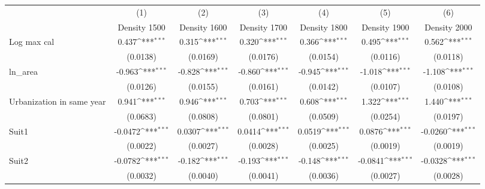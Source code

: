 {
\def\sym#1{\ifmmode^{#1}\else\(^{#1}\)\fi}
\begin{tabular}{l*{6}{c}}
\toprule
                    &\multicolumn{1}{c}{(1)}&\multicolumn{1}{c}{(2)}&\multicolumn{1}{c}{(3)}&\multicolumn{1}{c}{(4)}&\multicolumn{1}{c}{(5)}&\multicolumn{1}{c}{(6)}\\
                    &\multicolumn{1}{c}{Density 1500}&\multicolumn{1}{c}{Density 1600}&\multicolumn{1}{c}{Density 1700}&\multicolumn{1}{c}{Density 1800}&\multicolumn{1}{c}{Density 1900}&\multicolumn{1}{c}{Density 2000}\\
\midrule
Log max cal         &       0.437\sym{***}&       0.315\sym{***}&       0.320\sym{***}&       0.366\sym{***}&       0.495\sym{***}&       0.562\sym{***}\\
                    &    (0.0138)         &    (0.0169)         &    (0.0176)         &    (0.0154)         &    (0.0116)         &    (0.0118)         \\
\addlinespace
ln\_area             &      -0.963\sym{***}&      -0.828\sym{***}&      -0.860\sym{***}&      -0.945\sym{***}&      -1.018\sym{***}&      -1.108\sym{***}\\
                    &    (0.0126)         &    (0.0155)         &    (0.0161)         &    (0.0142)         &    (0.0107)         &    (0.0108)         \\
\addlinespace
Urbanization in same year&       0.941\sym{***}&       0.946\sym{***}&       0.703\sym{***}&       0.608\sym{***}&       1.322\sym{***}&       1.440\sym{***}\\
                    &    (0.0683)         &    (0.0808)         &    (0.0801)         &    (0.0509)         &    (0.0254)         &    (0.0197)         \\
\addlinespace
Suit1               &     -0.0472\sym{***}&      0.0307\sym{***}&      0.0414\sym{***}&      0.0519\sym{***}&      0.0876\sym{***}&     -0.0260\sym{***}\\
                    &    (0.0022)         &    (0.0027)         &    (0.0028)         &    (0.0025)         &    (0.0019)         &    (0.0019)         \\
\addlinespace
Suit2               &     -0.0782\sym{***}&      -0.182\sym{***}&      -0.193\sym{***}&      -0.148\sym{***}&     -0.0841\sym{***}&     -0.0328\sym{***}\\
                    &    (0.0032)         &    (0.0040)         &    (0.0041)         &    (0.0036)         &    (0.0027)         &    (0.0028)         \\

\end{tabular}}
